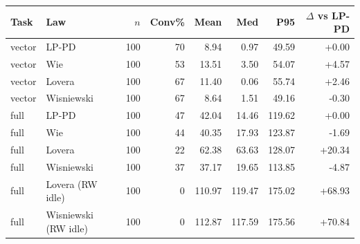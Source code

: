 \begin{tabular}{l l r r r r r r}
\hline
Task & Law & $n$ & Conv\% & Mean & Med & P95 & $\Delta$ vs LP-PD \\
\hline
vector & LP-PD & 100 & 70 & 8.94 & 0.97 & 49.59 & +0.00 \\
vector & Wie & 100 & 53 & 13.51 & 3.50 & 54.07 & +4.57 \\
vector & Lovera & 100 & 67 & 11.40 & 0.06 & 55.74 & +2.46 \\
vector & Wisniewski & 100 & 67 & 8.64 & 1.51 & 49.16 & -0.30 \\
\hline
full & LP-PD & 100 & 47 & 42.04 & 14.46 & 119.62 & +0.00 \\
full & Wie & 100 & 44 & 40.35 & 17.93 & 123.87 & -1.69 \\
full & Lovera & 100 & 22 & 62.38 & 63.63 & 128.07 & +20.34 \\
full & Wisniewski & 100 & 37 & 37.17 & 19.65 & 113.85 & -4.87 \\
full & Lovera (RW idle) & 100 & 0 & 110.97 & 119.47 & 175.02 & +68.93 \\
full & Wisniewski (RW idle) & 100 & 0 & 112.87 & 117.59 & 175.56 & +70.84 \\
\hline
\end{tabular}
